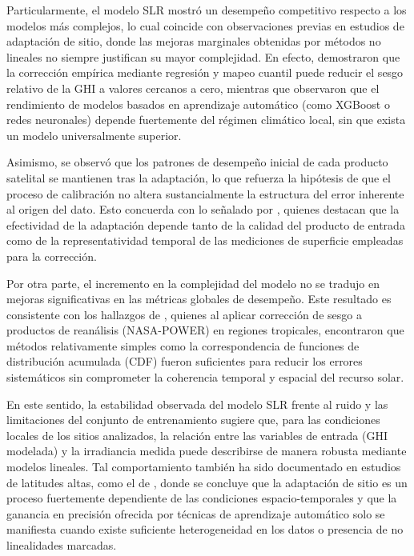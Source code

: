 \documentclass[letterpaper,12pt, twoside]{report}
\providecommand{\DIFdeltex}[1]{{\protect\color{red} \scriptsize #1}} %
\providecommand{\DIFdel}[1]{\texorpdfstring{\DIFdeltex{#1}}{}} %
\begin{document}
\DIFdel{Particularmente, el modelo SLR mostró un desempeño competitivo respecto a los modelos más complejos, lo cual coincide con observaciones previas en estudios de adaptación de sitio, donde las mejoras marginales obtenidas por métodos no lineales no siempre justifican su mayor complejidad. En efecto, \citep{Fernández2020} demostraron que la corrección empírica mediante regresión y mapeo cuantil puede reducir el sesgo relativo de la GHI a valores cercanos a cero, mientras que \citep{ZAINALI2024} observaron que el rendimiento de modelos basados en aprendizaje automático (como XGBoost o redes neuronales) depende fuertemente del régimen climático local, sin que exista un modelo universalmente superior.
}%

\DIFdel{Asimismo, se observó que los patrones de desempeño inicial de cada producto satelital se mantienen tras la adaptación, lo que refuerza la hipótesis de que el proceso de calibración no altera sustancialmente la estructura del error inherente al origen del dato. Esto concuerda con lo señalado por \cite{POLO2020}, quienes destacan que la efectividad de la adaptación depende tanto de la calidad del producto de entrada como de la representatividad temporal de las mediciones de superficie empleadas para la corrección.
}%

\DIFdel{Por otra parte, el incremento en la complejidad del modelo no se tradujo en mejoras significativas en las métricas globales de desempeño. Este resultado es consistente con los hallazgos de \citep{Quansah2024}, quienes al aplicar corrección de sesgo a productos de reanálisis (NASA-POWER) en regiones tropicales, encontraron que métodos relativamente simples como la correspondencia de funciones de distribución acumulada (CDF) fueron suficientes para reducir los errores sistemáticos sin comprometer la coherencia temporal y espacial del recurso solar.
}%

\DIFdel{En este sentido, la estabilidad observada del modelo SLR frente al ruido y las limitaciones del conjunto de entrenamiento sugiere que, para las condiciones locales de los sitios analizados, la relación entre las variables de entrada (GHI modelada) y la irradiancia medida puede describirse de manera robusta mediante modelos lineales. Tal comportamiento también ha sido documentado en estudios de latitudes altas, como el de \citep{ZAINALI2024}, donde se concluye que la adaptación de sitio es un proceso fuertemente dependiente de las condiciones espacio-temporales y que la ganancia en precisión ofrecida por técnicas de aprendizaje automático solo se manifiesta cuando existe suficiente heterogeneidad en los datos o presencia de no linealidades marcadas.
}%
\end{document}
